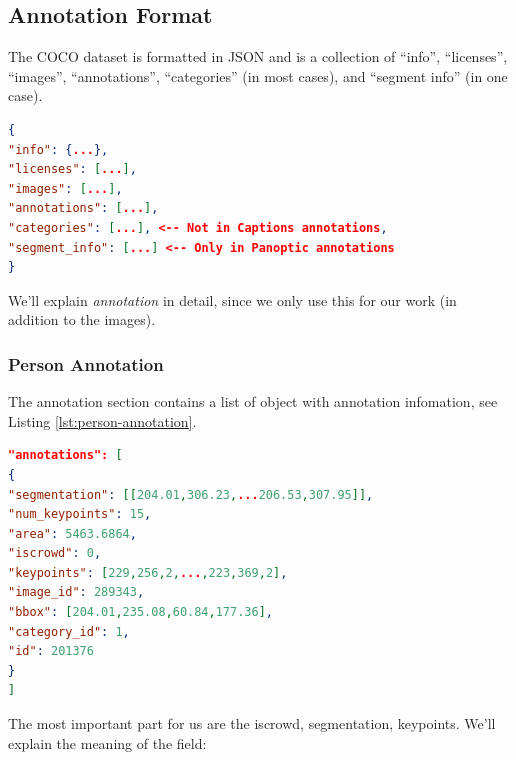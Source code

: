 \subsection{Annotation Format}
The COCO dataset is formatted in JSON and is a collection of “info”, “licenses”, “images”, “annotations”, “categories” (in most cases), and “segment info” (in one case).
\begin{lstlisting}[language=json,firstnumber=1, caption=Overview of JSON file in COCO 2017 Dataset]
{
"info": {...},
"licenses": [...],
"images": [...], 
"annotations": [...],
"categories": [...], <-- Not in Captions annotations,
"segment_info": [...] <-- Only in Panoptic annotations
}
\end{lstlisting}
We'll explain \textit{annotation} in detail, since we only use this for our work (in addition to the images).
\subsubsection{Person Annotation}
The annotation section contains a list of object with annotation infomation, see Listing \ref{lst:person-annotation}.
\begin{lstlisting}[language=json,firstnumber=1, caption=Overview of Person Class Annotation, label={lst:person-annotation}]
"annotations": [
{
"segmentation": [[204.01,306.23,...206.53,307.95]],
"num_keypoints": 15,
"area": 5463.6864,
"iscrowd": 0,
"keypoints": [229,256,2,...,223,369,2],
"image_id": 289343,
"bbox": [204.01,235.08,60.84,177.36],
"category_id": 1,
"id": 201376
}
]
\end{lstlisting}
The most important part for us are the iscrowd, segmentation, keypoints. We'll explain the meaning of the field:
